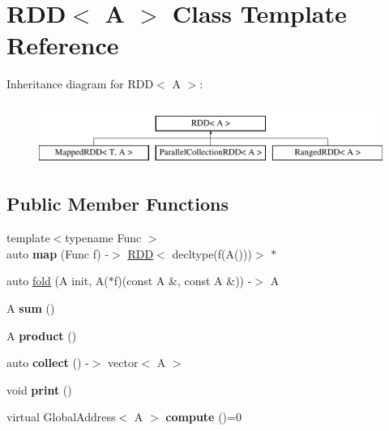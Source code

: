 \hypertarget{class_r_d_d}{}\section{R\+D\+D$<$ A $>$ Class Template Reference}
\label{class_r_d_d}
Inheritance diagram for R\+D\+D$<$ A $>$\+:\begin{figure}[H]
\begin{center}
\leavevmode
\includegraphics[height=2.000000cm]{class_r_d_d}
\end{center}
\end{figure}
\subsection*{Public Member Functions}
\begin{DoxyCompactItemize}
\item 
\hypertarget{class_r_d_d_adcb93ee8214e2be3dadd74da19bf3956}{}{\footnotesize template$<$typename Func $>$ }\\auto {\bfseries map} (Func f) -\/$>$ \hyperlink{class_r_d_d}{R\+D\+D}$<$ decltype(f(A()))$>$ $\ast$\label{class_r_d_d_adcb93ee8214e2be3dadd74da19bf3956}

\item 
auto \hyperlink{class_r_d_d_afb3f661ea1cc3aac6dbe66f764de1e43}{fold} (A init, A($\ast$f)(const A \&, const A \&)) -\/$>$ A
\item 
\hypertarget{class_r_d_d_a3e89daeddd050a5d6577e41f58b27b8c}{}A {\bfseries sum} ()\label{class_r_d_d_a3e89daeddd050a5d6577e41f58b27b8c}

\item 
\hypertarget{class_r_d_d_abbd3422e2760f4ca3af308cfb2606d50}{}A {\bfseries product} ()\label{class_r_d_d_abbd3422e2760f4ca3af308cfb2606d50}

\item 
\hypertarget{class_r_d_d_acd0b3de3863764e77ac9729a152f87c0}{}auto {\bfseries collect} () -\/$>$ vector$<$ A $>$\label{class_r_d_d_acd0b3de3863764e77ac9729a152f87c0}

\item 
\hypertarget{class_r_d_d_a3cee954e8f79a7066659ee4684fa7011}{}void {\bfseries print} ()\label{class_r_d_d_a3cee954e8f79a7066659ee4684fa7011}

\item 
\hypertarget{class_r_d_d_a7cbde0c28cf2ec9db04344e1e32e7217}{}virtual Global\+Address$<$ A $>$ {\bfseries compute} ()=0\label{class_r_d_d_a7cbde0c28cf2ec9db04344e1e32e7217}

\end{DoxyCompactItemize}

